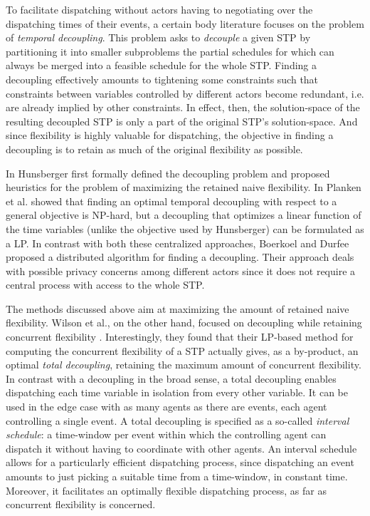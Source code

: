 	To facilitate dispatching without actors having to negotiating over the dispatching times of their events,
	a certain body literature focuses on the problem of \emph{temporal decoupling}.
	This problem asks to \emph{decouple} a given STP by partitioning it into smaller subproblems 
	the partial schedules for which can always be merged into a feasible schedule for the whole STP.
	Finding a decoupling effectively amounts to tightening some constraints such that 
	constraints between variables controlled by different actors become redundant,
	i.e. are already implied by other constraints.
	In effect, then, the solution-space of the resulting decoupled STP is only a part of the original STP's solution-space.
	And since flexibility is highly valuable for dispatching,
	the objective in finding a decoupling is to retain as much of the original flexibility as possible.

	In \cite{hunsberger:2002b} Hunsberger first formally defined the decoupling problem and proposed heuristics for 
	the problem of maximizing the retained naive flexibility.
	In \cite{plankenEtAl:2010} Planken et al. showed that finding an optimal temporal decoupling with respect to a general objective is NP-hard,
	but a decoupling that optimizes a linear function of the time variables (unlike the objective used by Hunsberger) can be formulated as a LP. 
	In contrast with both these centralized approaches, 
	Boerkoel and Durfee \cite{boerkoel:2011} proposed a distributed algorithm for finding a decoupling. 
	Their approach deals with possible privacy concerns among different actors
	since it does not require a central process with access to the whole STP.

	The methods discussed above aim at maximizing the amount of retained naive flexibility. 
	Wilson et al., on the other hand, focused on decoupling while retaining concurrent flexibility \cite{wilson:2014}.
	Interestingly, they found that their LP-based method for computing the concurrent flexibility of a STP actually gives, 
	as a by-product, an optimal \emph{total decoupling}, retaining the maximum amount of concurrent flexibility.
	In contrast with a decoupling in the broad sense,
	a total decoupling enables dispatching each time variable in isolation from every other variable.
	It can be used in the edge case with as many agents as there are events, each agent controlling a single event.
	A total decoupling is specified as a so-called \emph{interval schedule}:
	a time-window per event within which the controlling agent can dispatch it without having to coordinate with other agents.
	An interval schedule allows for a particularly efficient dispatching process,
	since dispatching an event amounts to just picking a suitable time from a time-window, in constant time.
	Moreover, it facilitates an optimally flexible dispatching process,
	as far as concurrent flexibility is concerned.

